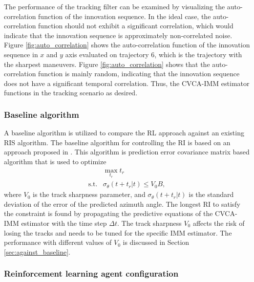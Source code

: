 \documentclass[english, 12pt, a4paper, elec, utf8, a-1b, online]{aaltothesis}
\numberwithin{equation}{section}
\newcommand{\dt}{\Delta t}
\newcommand{\ri}{t_r}
\begin{document}
The performance of the tracking filter can be examined by visualizing the auto-correlation function of the innovation sequence.
In the ideal case, the auto-correlation function should not exhibit a significant correlation, which would indicate that the innovation sequence is approximately non-correlated noise.
Figure \ref{fig:auto_correlation} shows the auto-correlation function of the innovation sequence in $x$ and $y$ axis evaluated on trajectory 6, which is the trajectory with the sharpest maneuvers.
Figure \ref{fig:auto_correlation} shows that the auto-correlation function is mainly random, indicating that the innovation sequence does not have a significant temporal correlation.
Thus, the CVCA-IMM estimator functions in the tracking scenario as desired.



\subsubsection{Baseline algorithm} \label{sec:baseline_algorithm}

A baseline algorithm is utilized to compare the RL approach against an existing RIS algorithm.
The baseline algorithm for controlling the RI is based on an approach proposed in \cite{Daeipour1994}.
This algorithm is prediction error covariance matrix based algorithm that is used to optimize
\begin{equation}\label{eq:baseline_ineq}
    \begin{array}{ll}
         & \max_{t_r} t_r \\
        \text{s.t.} & \sigma_\theta(t+\ri|t) \leq V_0 B, 
    \end{array}
\end{equation}
where $V_0$ is the track sharpness parameter, and $\sigma_\theta(t+\ri|t)$ is the standard deviation of the error of the predicted azimuth angle.
The longest RI to satisfy the constraint is found by propagating the predictive equations of the CVCA-IMM estimator with the time step $\dt$.
The track sharpness $V_0$ affects the risk of losing the tracks and needs to be tuned for the specific IMM estimator.
The performance with different values of $V_0$ is discussed in Section \ref{sec:against_baseline}.

\subsubsection{Reinforcement learning agent configuration}\label{sec:RL_config}
\end{document}
